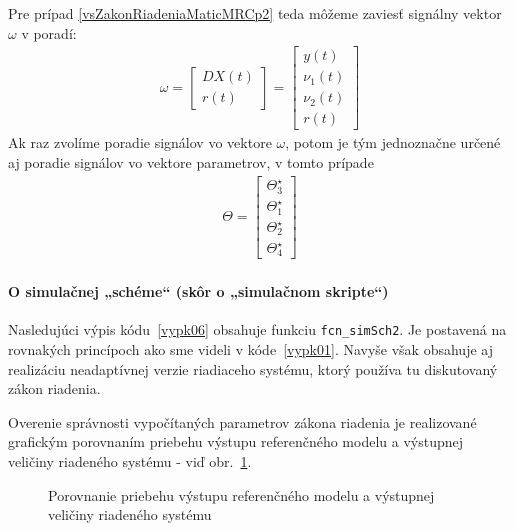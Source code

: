 \documentclass[a4paper, 10pt, ]{article}
\begin{document}
Pre prípad \eqref{vsZakonRiadeniaMaticMRCp2} teda môžeme zaviesť signálny vektor $\omega$ v poradí:
\begin{align}
    \omega =
    \begin{bmatrix}
          DX(t) \\  r(t)
    \end{bmatrix}
    =
    \begin{bmatrix}
          y(t) \\ \nu_1(t) \\ \nu_2(t) \\  r(t)
    \end{bmatrix}
\end{align}
Ak raz zvolíme poradie signálov vo vektore $\omega$, potom je tým jednoznačne určené aj poradie signálov vo vektore parametrov, v tomto prípade
\begin{align}
    \Theta =
    \begin{bmatrix}
          \Theta_3^\star \\ \Theta_1^\star \\ \Theta_2^\star \\ \Theta_4^\star
    \end{bmatrix}
\end{align}










\paragraph{O simulačnej „schéme“ (skôr o „simulačnom skripte“)}

Nasledujúci výpis kódu~\ref{vypk06} obsahuje funkciu \lstinline|fcn_simSch2|. Je postavená na rovnakých princípoch ako sme videli v kóde~\ref{vypk01}. Navyše však obsahuje aj realizáciu neadaptívnej verzie riadiaceho systému, ktorý používa tu diskutovaný zákon riadenia.

Overenie správnosti vypočítaných parametrov zákona riadenia je realizované grafickým porovnaním priebehu výstupu referenčného modelu a výstupnej veličiny riadeného systému - viď obr.~\ref{figsc_ar06_MRC_1}.




\begin{figure}[!t]
    \centering


    \caption{Porovnanie priebehu výstupu referenčného modelu a výstupnej veličiny riadeného systému}
    \label{figsc_ar06_MRC_1}

\end{figure}
\end{document}
